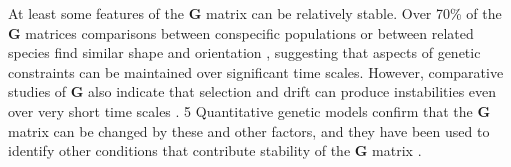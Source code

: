 \documentclass[9pt,twocolumn,twoside]{gsajnl}
\newcommand{\G}{\textbf{G }}
\begin{document}

% 
% 



At least some features of the \G matrix can be relatively stable. Over 70\% of the \G matrices comparisons between conspecific populations or between related species find similar shape and orientation \cite{Arnold2008}, suggesting that aspects of genetic constraints can be maintained over significant time scales. However, comparative studies of \G also indicate that selection and drift can produce instabilities even over very short time scales \cite{bjorklund2013rapid,Siren2017,Phillips2001,wilkinson1990resistance,roff1999does,Steppan1997,Waldmann2000}. 
5
Quantitative genetic models confirm that the \G matrix can be changed by these and other factors, and they have been used to identify other conditions that contribute stability of the \G matrix \citep{Turelli1988,barton1989evolutionary,reeve2000predicting}. 
\end{document}
